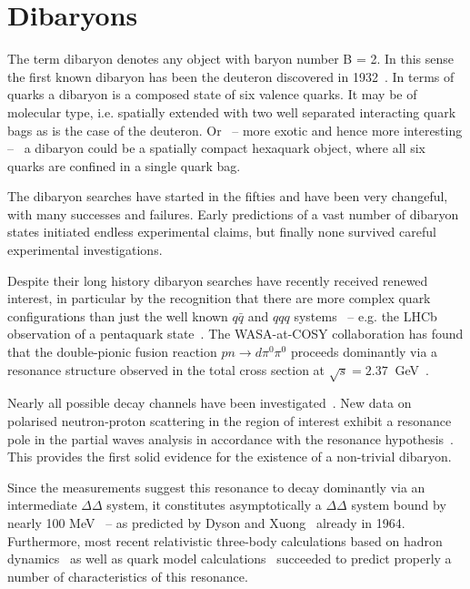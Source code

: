 %
\chapter{Dibaryons} \label{sec:2}



The term dibaryon denotes any object with baryon number B = 2. In this sense the first known dibaryon
has been the deuteron discovered in 1932~\cite{deu_disc}.
In terms of quarks a dibaryon is a composed state of six valence quarks.
It may be of molecular type, i.e. spatially extended with two well separated interacting quark 
bags as is the case of the deuteron. Or \ -- more exotic and hence more interesting -- \ a dibaryon
could be a spatially compact hexaquark object, where all six quarks are confined in a single quark bag.

The dibaryon searches have started in the fifties and have been very changeful, with many 
successes and failures. 
Early predictions of a vast number of dibaryon states initiated endless experimental claims,
but finally none survived careful experimental investigations. 

Despite their long history dibaryon searches have recently received renewed interest,
in particular by the recognition that there are more complex quark configurations than just the 
well known $q\bar{q}$ and $qqq$ systems \ -- e.g. the LHCb observation of a pentaquark 
state~\cite{lhcbpenta}.
The WASA-at-COSY collaboration has found that the double-pionic fusion reaction $pn \rightarrow 
d \pi^{0} \pi^{0}$ proceeds dominantly via a resonance structure observed in the total cross section 
at $\sqrt{s} = 2.37\ $ GeV~\cite{wasa1}. 


Nearly all possible decay channels have been investigated~\cite{wasa2, wasa3, wasa4}.
New data on polarised neutron-proton scattering in the region of interest exhibit a resonance pole in 
the partial waves analysis in accordance with the resonance hypothesis~\cite{wasa5,wasa6}.
This provides the first solid evidence for the existence of a non-trivial dibaryon.

Since the measurements suggest this resonance to decay dominantly via an intermediate $\Delta \Delta$
system, it constitutes asymptotically a $\Delta \Delta$ system bound by nearly 100 MeV \ -- as 
predicted by Dyson and Xuong~\cite{dysonxuong} already in 1964.
Furthermore, most recent relativistic three-body calculations based on hadron dynamics~\cite{haddin}
as well as quark model calculations~\cite{dsqm1,dsqm2} succeeded to predict properly a number
of characteristics of this resonance.

